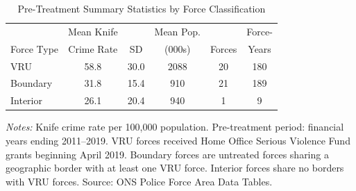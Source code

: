 \begin{table}[htbp]
\centering
\caption{Pre-Treatment Summary Statistics by Force Classification}
\label{tab:summary}
\begin{threeparttable}
\begin{tabular}{lccccc}
\toprule
 & Mean Knife & & Mean Pop. & & Force- \\
Force Type & Crime Rate & SD & (000s) & Forces & Years \\
\midrule
VRU & 58.8 & 30.0 & 2088 & 20 & 180 \\
Boundary & 31.8 & 15.4 & 910 & 21 & 189 \\
Interior & 26.1 & 20.4 & 940 & 1 & 9 \\
\bottomrule
\end{tabular}
\begin{tablenotes}[flushleft]\footnotesize
\item \textit{Notes:} Knife crime rate per 100,000 population. Pre-treatment period: financial years ending 2011--2019. VRU forces received Home Office Serious Violence Fund grants beginning April 2019. Boundary forces are untreated forces sharing a geographic border with at least one VRU force. Interior forces share no borders with VRU forces. Source: ONS Police Force Area Data Tables.
\end{tablenotes}
\end{threeparttable}
\end{table}

